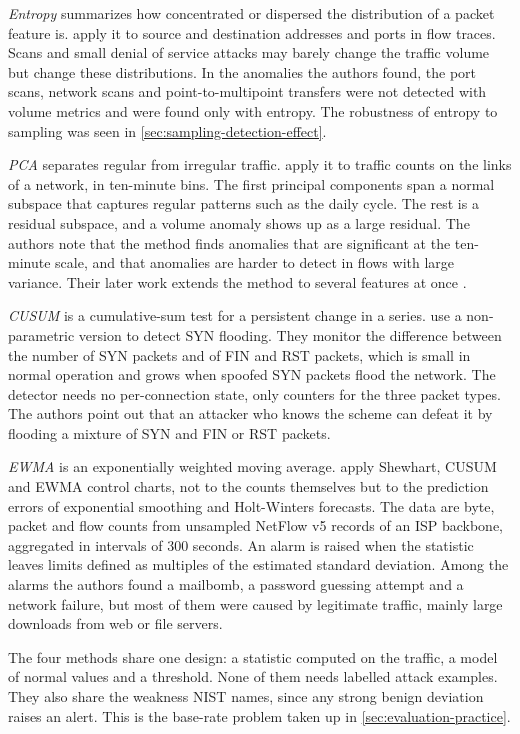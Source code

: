 \emph{Entropy} summarizes how concentrated or dispersed the distribution of a
packet feature is. \citet{lakhina2005mining} apply it to source and
destination addresses and ports in flow traces. Scans and small denial of
service attacks may barely change the traffic volume but change these
distributions. In the anomalies the authors found, the port scans, network
scans and point-to-multipoint transfers were not detected with volume
metrics and were found only with entropy. The robustness of entropy to
sampling was seen in \cref{sec:sampling-detection-effect}.

\emph{PCA} separates regular from irregular traffic. \citet{lakhina2004diagnosing}
apply it to traffic counts on the links of a network, in ten-minute bins. The
first principal components span a normal subspace that captures regular
patterns such as the daily cycle. The rest is a residual subspace, and a
volume anomaly shows up as a large residual. The authors note that the method
finds anomalies that are significant at the ten-minute scale, and that
anomalies are harder to detect in flows with large variance. Their later
work extends the method to several features at once \citep{lakhina2005mining}.

\emph{CUSUM} is a cumulative-sum test for a persistent change in a series.
\citet{wang2002detecting} use a non-parametric version to detect SYN
flooding. They monitor the difference between the number of SYN packets and
of FIN and RST packets, which is small in normal operation and grows when
spoofed SYN packets flood the network. The detector needs no per-connection
state, only counters for the three packet types. The authors point out that
an attacker who knows the scheme can defeat it by flooding a mixture of SYN
and FIN or RST packets.

\emph{EWMA} is an exponentially weighted moving average. \citet{muenz2008control}
apply Shewhart, CUSUM and EWMA control charts, not to the counts themselves
but to the prediction errors of exponential smoothing and Holt-Winters
forecasts. The data are byte, packet and flow counts from unsampled NetFlow
v5 records of an ISP backbone, aggregated in intervals of 300 seconds. An
alarm is raised when the statistic leaves limits defined as multiples of the
estimated standard deviation. Among the alarms the authors found a mailbomb,
a password guessing attempt and a network failure, but most of them were
caused by legitimate traffic, mainly large downloads from web or file
servers.

The four methods share one design: a statistic computed on the traffic, a
model of normal values and a threshold. None of them needs labelled attack
examples. They also share the weakness NIST names, since any strong benign
deviation raises an alert. This is the base-rate problem taken up in
\cref{sec:evaluation-practice}.

